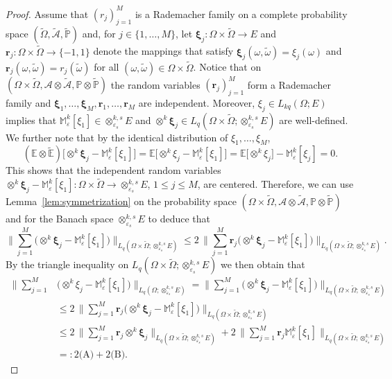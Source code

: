 \documentclass[10pt,a4paper]{amsart}
\newcommand{\Mk}{\bbM^k_\varepsilon}
\newcommand{\Omegat}{\widetilde{\Omega}}
\newcommand{\bbE}{\mathbb{E}}
\newcommand{\bbEt}{\widetilde{\bbE}}
\newcommand{\bbM}{\mathbb{M}}
\newcommand{\bbP}{\mathbb{P}}
\newcommand{\bbPt}{\widetilde{\bbP}}
\newcommand{\cA}{\mathcal{A}}
\newcommand{\cAt}{\widetilde{\cA}}
\newcommand{\from}{\colon}
\newcommand{\omegat}{\widetilde{\omega}}
\newcommand{\rvec}{\boldsymbol{r}}
\newcommand{\xivec}{\boldsymbol{\xi}}
\newcommand{\xk}{\otimes^k}
\newcommand{\xkseps}{\otimes^{k,s}_{\varepsilon_s}}
\begin{document}
\begin{proof} 
	Assume that $(r_j)_{j=1}^M$ is 
	a Rademacher family on a complete probability space 
	$(\Omegat,\cAt,\bbPt)$ 
	and, for $j\in\{1,\ldots,M\}$, 
	let $\xivec_j\from\Omega\times\Omegat\to E$ 
	and $\rvec_j\from\Omega\times\Omegat\to \{-1,1\}$ denote the mappings 
	that satisfy $\xivec_j(\omega,\omegat) = \xi_j(\omega)$ 
	and $\rvec_j(\omega,\omegat) = r_j(\omegat)$ 
	for all $(\omega,\omegat)\in\Omega\times\Omegat$. 
	Notice that 
	on $(\Omega \times \Omegat,\cA \otimes \cAt,\bbP\otimes\bbPt)$ 
	the random variables 
	$(\rvec_j)_{j=1}^M$ form a Rademacher family and 
	$\xivec_1,\ldots,\xivec_M,\rvec_1,\ldots,\rvec_M$ 
	are independent. 
	Moreover,  
	$\xi_j \in L_{kq}(\Omega;E)$ implies that 
	$\Mk[\xi_1] \in \xkseps E$ and 
	$\xk \xivec_j \in L_q(\Omega\times\widetilde{\Omega};\xkseps E)$ 
	are well-defined. 
	We further note that by the identical distribution 
	of $\xi_1,\ldots,\xi_M$, 
	\[
	(\bbE\otimes\bbEt)\bigl[  \xk \xivec_j  -  \Mk[\xi_1] \bigr]  
	= 
	\bbE\bigl[ \xk \xi_j -  \Mk[\xi_1] \bigr]  
	=
	\bbE\bigl[ \xk \xi_j \bigr] -  \Mk[\xi_j]  
	= 
	0. 
	\]  
	This shows that the independent random variables 
	$\xk \xivec_j  -  \Mk[\xi_1]\from \Omega\times\Omegat \to \xkseps E$, 
	$1\leq j\leq M$, 
	are centered. 
	Therefore, 
	we can use Lemma~\ref{lem:symmetrization}  
	on the 
	probability space 
	$(\Omega \times \Omegat,\cA \otimes \cAt,\bbP\otimes\bbPt)$ 
	and for the Banach space $\xkseps E$ to deduce that 
	\[
	\biggl\| 
	\sum_{j=1}^M 
	\bigl( \xk \xivec_j  
	-  \Mk[\xi_1] \bigr)
	\biggr\|_{L_q(\Omega\times\widetilde{\Omega};\xkseps E)} 
	\leq 
	2\, 
	\biggl\| 
	\sum_{j=1}^M 
	\rvec_j 
	\bigl( \xk \xivec_j  
	-  \Mk[\xi_1] \bigr)
	\biggr\|_{L_q(\Omega\times\widetilde{\Omega};\xkseps E)} . 
	\]
	By the triangle inequality 
	on $L_q(\Omega\times\widetilde{\Omega};\xkseps E)$ 
	we then obtain 
	that 
	\begin{equation}\label{eq:proof:thm:MC-k:A-B} 
	\begin{split}  
	\biggl\| 
	\sum_{j=1}^M 
	&\bigl(\xk \xi_j 
	-  \Mk[\xi_1] \bigr)
	\biggr\|_{L_q(\Omega;\xkseps E)} 
	= 
	\biggl\| 
	\sum_{j=1}^M 
	\bigl( \xk \xivec_j  
	-  \Mk[\xi_1] \bigr)
	\biggr\|_{L_q(\Omega\times\widetilde{\Omega};\xkseps E)} 
	\\
	&\leq 
	2\, 
	\biggl\| 
	\sum_{j=1}^M 
	\rvec_j 
	\bigl( \xk \xivec_j  
	-  \Mk[\xi_1] \bigr)
	\biggr\|_{L_q(\Omega\times\widetilde{\Omega};\xkseps E)}  
	\\
	&\leq 
	2\, 
	\biggl\| 
	\sum_{j=1}^M 
	\rvec_j 
	\xk\! \xivec_j  
	\biggr\|_{L_q(\Omega\times\widetilde{\Omega};\xkseps E)}   
	+ 
	2\, 
	\biggl\| 
	\sum_{j=1}^M 
	\rvec_j 
	\Mk[\xi_1] 
	\biggr\|_{L_q(\Omega\times\widetilde{\Omega};\xkseps E)}   
	\\
	&=: 
	2\text{(A)} + 2\text{(B)}. 
	\end{split} 
	\end{equation} 
	

\end{proof}
\end{document}
